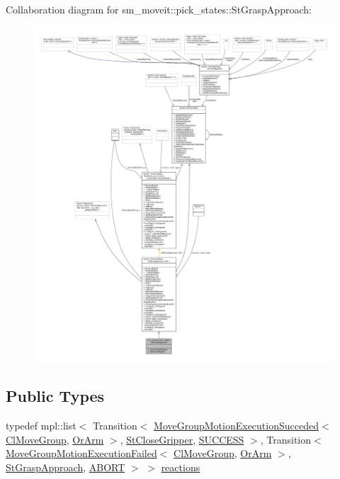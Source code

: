 Collaboration diagram for sm\+\_\+moveit\+:\+:pick\+\_\+states\+:\+:St\+Grasp\+Approach\+:
\nopagebreak
\begin{figure}[H]
\begin{center}
\leavevmode
\includegraphics[width=350pt]{structsm__moveit_1_1pick__states_1_1StGraspApproach__coll__graph}
\end{center}
\end{figure}
\subsection*{Public Types}
\begin{DoxyCompactItemize}
\item 
typedef mpl\+::list$<$ Transition$<$ \hyperlink{structmove__group__interface__client_1_1MoveGroupMotionExecutionSucceded}{Move\+Group\+Motion\+Execution\+Succeded}$<$ \hyperlink{classmove__group__interface__client_1_1ClMoveGroup}{Cl\+Move\+Group}, \hyperlink{classsm__moveit_1_1OrArm}{Or\+Arm} $>$, \hyperlink{structsm__moveit_1_1pick__states_1_1StCloseGripper}{St\+Close\+Gripper}, \hyperlink{classSUCCESS}{S\+U\+C\+C\+E\+SS} $>$, Transition$<$ \hyperlink{structmove__group__interface__client_1_1MoveGroupMotionExecutionFailed}{Move\+Group\+Motion\+Execution\+Failed}$<$ \hyperlink{classmove__group__interface__client_1_1ClMoveGroup}{Cl\+Move\+Group}, \hyperlink{classsm__moveit_1_1OrArm}{Or\+Arm} $>$, \hyperlink{structsm__moveit_1_1pick__states_1_1StGraspApproach}{St\+Grasp\+Approach}, \hyperlink{classABORT}{A\+B\+O\+RT} $>$ $>$ \hyperlink{structsm__moveit_1_1pick__states_1_1StGraspApproach_a459914092dd4d74c25550ca4438a3ff4}{reactions}
\end{DoxyCompactItemize}
